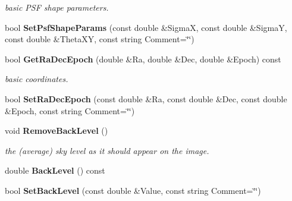 \begin{CompactItemize}
\begin{CompactList}\small\item\em basic PSF shape parameters.\item\end{CompactList}\item 
{}
bool {\bf Set\-Psf\-Shape\-Params} (const double \&Sigma\-X, const double \&Sigma\-Y, const double \&Theta\-XY, const string Comment=\char`\"{}\char`\"{})\label{class_reducedimage_a43}

\item 
{}
bool {\bf Get\-Ra\-Dec\-Epoch} (double \&Ra, double \&Dec, double \&Epoch) const\label{class_reducedimage_a44}

\begin{CompactList}\small\item\em basic coordinates.\item\end{CompactList}\item 
{}
bool {\bf Set\-Ra\-Dec\-Epoch} (const double \&Ra, const double \&Dec, const double \&Epoch, const string Comment=\char`\"{}\char`\"{})\label{class_reducedimage_a45}

\item 
{}
void {\bf Remove\-Back\-Level} ()\label{class_reducedimage_a46}

\begin{CompactList}\small\item\em the (average) sky level as it should appear on the image.\item\end{CompactList}\item 
{}
double {\bf Back\-Level} () const\label{class_reducedimage_a47}

\item 
{}
bool {\bf Set\-Back\-Level} (const double \&Value, const string Comment=\char`\"{}\char`\"{})\label{class_reducedimage_a48}


\end{CompactItemize}
